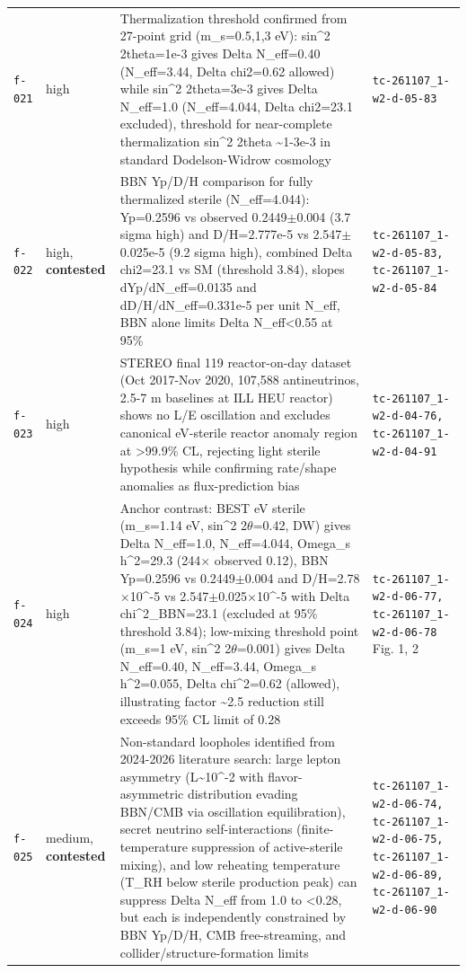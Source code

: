 \documentclass[11pt,a4paper]{article}
\begin{document}
\begin{longtable}{@{}p{}p{}p{}p{}@{}}
\texttt{f-021} & high & Thermalization threshold confirmed from 27-point grid (m\_s=0.5,1,3 eV): sin\textasciicircum{}2 2theta=1e-3 gives Delta N\_eff=0.40 (N\_eff=3.44, Delta chi2=0.62 allowed) while sin\textasciicircum{}2 2theta=3e-3 gives Delta N\_eff=1.0 (N\_eff=4.044, Delta chi2=23.1 excluded), threshold for near-complete thermalization sin\textasciicircum{}2 2theta \textasciitilde{}1-3e-3 in standard Dodelson-Widrow cosmology & \texttt{tc-261107\_\allowbreak{}1-w2-d-05-83} \\
\texttt{f-022} & high, \textbf{contested} & BBN Yp/D/H comparison for fully thermalized sterile (N\_eff=4.044): Yp=0.2596 vs observed 0.2449$\pm$0.004 (3.7 sigma high) and D/H=2.777e-5 vs 2.547$\pm$0.025e-5 (9.2 sigma high), combined Delta chi2=23.1 vs SM (threshold 3.84), slopes dYp/dN\_eff=0.0135 and dD/H/dN\_eff=0.331e-5 per unit N\_eff, BBN alone limits Delta N\_eff\textless{}0.55 at 95\% & \texttt{tc-261107\_\allowbreak{}1-w2-d-05-83,\allowbreak{} tc-261107\_\allowbreak{}1-w2-d-05-84} \\
\texttt{f-023} & high & STEREO final 119 reactor-on-day dataset (Oct 2017-Nov 2020, 107,588 antineutrinos, 2.5-7 m baselines at ILL HEU reactor) shows no L/E oscillation and excludes canonical eV-sterile reactor anomaly region at \textgreater{}99.9\% CL, rejecting light sterile hypothesis while confirming rate/shape anomalies as flux-prediction bias & \texttt{tc-261107\_\allowbreak{}1-w2-d-04-76,\allowbreak{} tc-261107\_\allowbreak{}1-w2-d-04-91} \\
\texttt{f-024} & high & Anchor contrast: BEST eV sterile (m\_s=1.14 eV, sin\textasciicircum{}2 2$\theta$=0.42, DW) gives Delta N\_eff=1.0, N\_eff=4.044, Omega\_s h\textasciicircum{}2=29.3 (244$\times$ observed 0.12), BBN Yp=0.2596 vs 0.2449$\pm$0.004 and D/H=2.78$\times$10\textasciicircum{}-5 vs 2.547$\pm$0.025$\times$10\textasciicircum{}-5 with Delta chi\textasciicircum{}2\_BBN=23.1 (excluded at 95\% threshold 3.84); low-mixing threshold point (m\_s=1 eV, sin\textasciicircum{}2 2$\theta$=0.001) gives Delta N\_eff=0.40, N\_eff=3.44, Omega\_s h\textasciicircum{}2=0.055, Delta chi\textasciicircum{}2=0.62 (allowed), illustrating factor \textasciitilde{}2.5 reduction still exceeds 95\% CL limit of 0.28 & \texttt{tc-261107\_\allowbreak{}1-w2-d-06-77,\allowbreak{} tc-261107\_\allowbreak{}1-w2-d-06-78} Fig. 1, 2 \\
\texttt{f-025} & medium, \textbf{contested} & Non-standard loopholes identified from 2024-2026 literature search: large lepton asymmetry (L\textasciitilde{}10\textasciicircum{}-2 with flavor-asymmetric distribution evading BBN/CMB via oscillation equilibration), secret neutrino self-interactions (finite-temperature suppression of active-sterile mixing), and low reheating temperature (T\_RH below sterile production peak) can suppress Delta N\_eff from 1.0 to \textless{}0.28, but each is independently constrained by BBN Yp/D/H, CMB free-streaming, and collider/structure-formation limits & \texttt{tc-261107\_\allowbreak{}1-w2-d-06-74,\allowbreak{} tc-261107\_\allowbreak{}1-w2-d-06-75,\allowbreak{} tc-261107\_\allowbreak{}1-w2-d-06-89,\allowbreak{} tc-261107\_\allowbreak{}1-w2-d-06-90} \\

\end{longtable}
\end{document}
